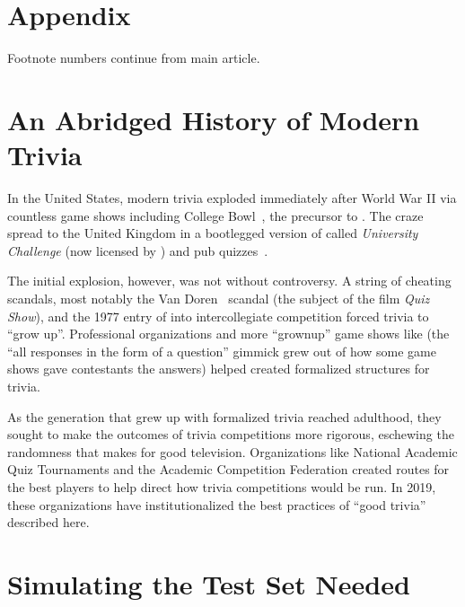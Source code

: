 

\section*{Appendix}

Footnote numbers continue from main article.

\section{An Abridged History of Modern Trivia}
\label{sec:history}

In the United  States, modern trivia exploded  immediately after World
War    II    via    countless    game    shows    including    College
Bowl~\cite{Baber-15}, the precursor to \qb{}.
The craze spread to the United Kingdom in a bootlegged version of \qb{} called \textit{University Challenge} (now licensed by ) and pub quizzes~\cite{taylor_mcnulty_meek}.

The initial explosion, however, was not without controversy.
A string of cheating scandals, most notably the Van Doren~\cite{freedman-97} scandal (the subject of the film \textit{Quiz Show}), and the 1977 entry of \qb{} into intercollegiate competition forced trivia to ``grow up''.
Professional organizations and more ``grownup'' game shows like \jeopardy{} (the ``all responses in the form of a question'' gimmick grew out of how some game shows gave contestants the answers) helped created formalized structures for trivia.

As the generation that grew up with formalized trivia reached adulthood, they sought to make the outcomes of trivia competitions more rigorous, eschewing the randomness that makes for good television.
Organizations like National Academic Quiz Tournaments and the Academic Competition Federation created routes for the best players to help direct how trivia competitions would be run.
In 2019, these organizations have institutionalized the best practices of ``good trivia'' described here.

\section{Simulating the Test Set Needed}
\label{sec:synthetic-discriminative}

